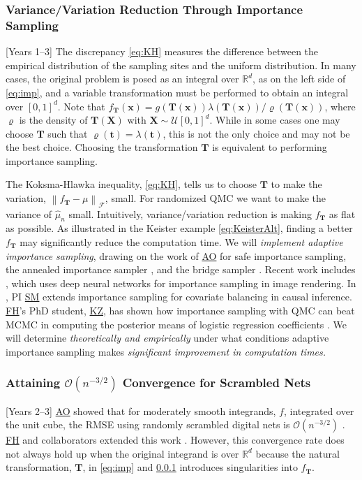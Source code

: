 \documentclass[11pt]{NSFamsart}
\newcommand{\FH}{\hyperlink{FHlink}{FH}\xspace}
\newcommand{\SM}{\hyperlink{SMlink}{SM}\xspace}
\newcommand{\AO}{\hyperlink{AOlink}{AO}\xspace}
\newcommand{\KZ}{\hyperlink{KZlink}{KZ}\xspace}
\newcommand{\reals}{{\mathbb{R}}}
\newcommand{\bt}{{\boldsymbol{t}}}
\newcommand{\bT}{{\boldsymbol{T}}}
\newcommand{\bx}{{\boldsymbol{x}}}
\newcommand{\bX}{{\boldsymbol{X}}}
\newcommand{\calf}{{\mathcal{F}}}
\newcommand{\calu}{{\mathcal{U}}}
\newcommand{\norm}[2][{}]{\ensuremath{\left \lVert #2 \right \rVert}_{#1}}
\newcommand{\Order}{\mathcal{O}}
\newcommand{\hmu}{\hat{\mu}}
\begin{document}
\subsubsection{Variance/Variation Reduction Through Importance Sampling} \label{sec:imp} %
[Years 1--3]  The discrepancy \eqref{eq:KH} measures the difference between the empirical distribution of the sampling sites and the uniform distribution.  In many cases, the original problem is posed as an integral over $\reals^d$, as on the left side of \eqref{eq:imp}, and a variable transformation must be performed to obtain an integral over $[0,1]^d$.  Note that $f_{\bT}(\bx) = g(\bT(\bx)) \lambda(\bT(\bx)) / \varrho(\bT(\bx))$, where $\varrho$ is the density of $\bT(\bX)$ with $\bX \sim \calu[0,1]^d$.  While in some cases one may choose $\bT$ such that $\varrho(\bt) = \lambda(\bt)$, this is not the only choice and may not be the best choice.  Choosing the transformation $\bT$ is equivalent to performing importance sampling.   

The Koksma-Hlawka inequality, \eqref{eq:KH}, tells us to choose $\bT$ to make the variation, $\norm[\calf]{f_{\bT} - \mu}$, small.  For randomized QMC we want to make the variance of $\hmu_n$ small.  Intuitively, variance/variation reduction is making $f_{\bT}$ as flat as possible. As illustrated in the Keister example \eqref{eq:KeisterAlt}, finding a better $f_{\bT}$ may significantly reduce the computation time.  We will \emph{implement adaptive importance sampling}, drawing on the work of  
\AO \cite{owen2000safe} for safe importance sampling, the  annealed importance sampler \cite{neal2001annealed}, and the bridge sampler \cite{gelman1998simulating}.  Recent work includes \cite{mueller2019neural}, which uses deep neural networks for importance sampling in image rendering.  In \cite{huling2020energy}, PI \SM extends importance sampling for covariate balancing in causal inference.  \FH's PhD student, \KZ, has shown how importance sampling with QMC can beat MCMC in computing the posterior means of logistic regression coefficients \cite{Zha21a}.  We will determine \emph{theoretically and empirically} under what conditions adaptive importance sampling makes \emph{significant improvement in computation times.}

\subsubsection{Attaining $\Order(n^{-3/2})$ Convergence for Scrambled Nets} \label{sec:threehalves}
[Years 2--3] \AO showed that for moderately smooth integrands, $f$, integrated over the unit cube, the RMSE using randomly scrambled digital nets is $\Order(n^{-3/2})$ \cite{Owe97}.  \FH and collaborators extended this work \cite{HicYue00,HeiHicYue02a}.  However, this convergence rate does not always hold up when the original integrand is over $\reals^d$ because the natural transformation, $\bT$,  in \eqref{eq:imp} and \cref{sec:imp} introduces singularities into $f_{\bT}$.
\end{document}

